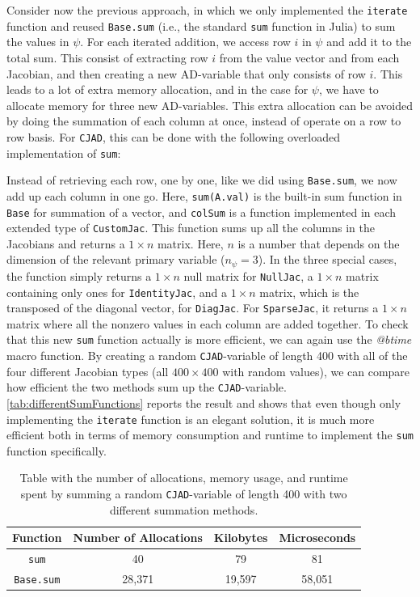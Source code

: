 Consider now the previous approach, in which we only implemented the \texttt{iterate} function and reused \texttt{Base.sum} (i.e., the standard \texttt{sum} function in Julia) to sum the values in $\psi$. For each iterated addition, we access row $i$ in $\psi$ and add it to the total sum. This consist of extracting row $i$ from the value vector and from each Jacobian, and then creating a new AD-variable that only consists of row $i$. This leads to a lot of extra memory allocation, and in the case for $\psi$, we have to allocate memory for three new AD-variables. This extra allocation can be avoided by doing the summation of each column at once, instead of operate on a row to row basis. For \texttt{CJAD}, this can be done with the following overloaded implementation of \texttt{sum}:

Instead of retrieving each row, one by one, like we did using \texttt{Base.sum}, we now add up each column in one go. Here, \texttt{sum(A.val)} is the built-in sum function in \texttt{Base} for summation of a vector, and \texttt{colSum} is a function implemented in each extended type of \texttt{CustomJac}. This function sums up all the columns in the Jacobians and returns a $1\times n$ matrix. Here, $n$ is a number that depends on the dimension of the relevant primary variable ($n_\psi = 3$). In the three special cases, the function simply returns a $1\times n$ null matrix for \texttt{NullJac}, a $1\times n$ matrix containing only ones for \texttt{IdentityJac}, and a $1\times n$ matrix, which is the transposed of the diagonal vector, for \texttt{DiagJac}.  For \texttt{SparseJac}, it returns a $1\times n$ matrix where all the nonzero values in each column are added together. To check that this new \texttt{sum} function actually is more efficient, we can again use the \textit{@btime} macro function. By creating a random \texttt{CJAD}-variable of length 400 with all of the four different Jacobian types (all $400\times 400$ with random values), we can compare how efficient the two methods sum up the \texttt{CJAD}-variable. \autoref{tab:differentSumFunctions} reports the  result and shows that even though only implementing the \texttt{iterate} function is an elegant solution, it is much more efficient both in terms of memory consumption and runtime to implement the \texttt{sum} function specifically.

\begin{table}[H]
    \centering
    \caption{Table with the number of allocations, memory usage, and runtime spent by summing a random \texttt{CJAD}-variable of length 400 with two different summation methods.}
    \label{tab:differentSumFunctions}
    \def\arraystretch{1.5}
    \begin{tabular}{cccc}
    \textbf{Function} & \textbf{Number of Allocations} & \textbf{Kilobytes} & \textbf{Microseconds} \\
        \hline
         \texttt{sum} & 40 & 79 & 81 \\  
         \texttt{Base.sum} & 28,371 & 19,597 & 58,051\\ 
         \hline
    \end{tabular}
\end{table}

